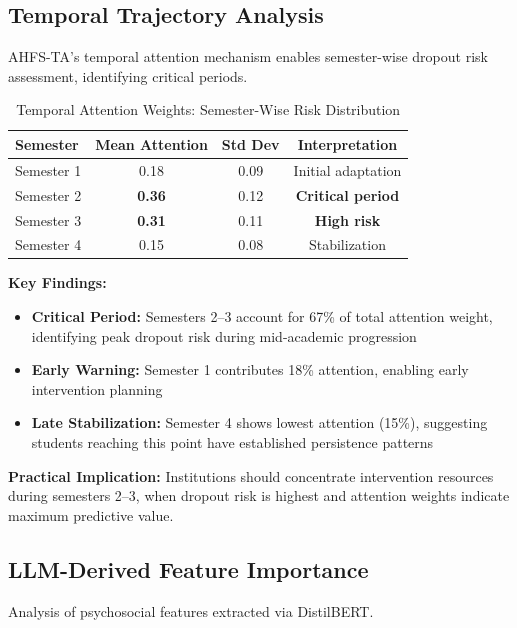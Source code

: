 \subsection{Temporal Trajectory Analysis}

AHFS-TA's temporal attention mechanism enables semester-wise dropout risk assessment, identifying critical periods.

\begin{table}[h]
\centering
\caption{Temporal Attention Weights: Semester-Wise Risk Distribution}
\label{tab:temporal_weights}
\begin{tabular}{lccc}
\toprule
\textbf{Semester} & \textbf{Mean Attention} & \textbf{Std Dev} & \textbf{Interpretation} \\
\midrule
Semester 1 & 0.18 & 0.09 & Initial adaptation \\
Semester 2 & \textbf{0.36} & 0.12 & \textbf{Critical period} \\
Semester 3 & \textbf{0.31} & 0.11 & \textbf{High risk} \\
Semester 4 & 0.15 & 0.08 & Stabilization \\
\bottomrule
\end{tabular}
\end{table}

\textbf{Key Findings:}
\begin{itemize}
\item \textbf{Critical Period:} Semesters 2--3 account for 67\% of total attention weight, identifying peak dropout risk during mid-academic progression
\item \textbf{Early Warning:} Semester 1 contributes 18\% attention, enabling early intervention planning
\item \textbf{Late Stabilization:} Semester 4 shows lowest attention (15\%), suggesting students reaching this point have established persistence patterns
\end{itemize}

\textbf{Practical Implication:} Institutions should concentrate intervention resources during semesters 2--3, when dropout risk is highest and attention weights indicate maximum predictive value.

\subsection{LLM-Derived Feature Importance}

Analysis of psychosocial features extracted via DistilBERT.

